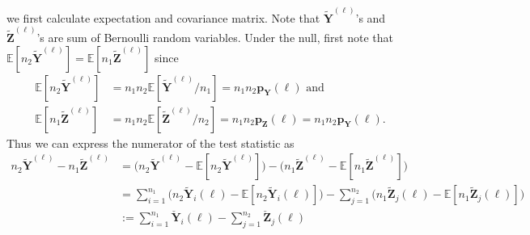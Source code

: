 \documentclass[11pt]{article} %
\newcommand{\vecBold}[1]{\boldsymbol{#1}} %
\newcommand{\distparamMultinom}{\boldsymbol{p}}
\newcommand{\mE}{\mathbb{E}} %
\newcommand{\rvY}{Y}
\newcommand{\rVecY}{\vecBold{\rvY}}
\newcommand{\rvZ}{Z}
\newcommand{\rVecZ}{\vecBold{\rvZ}}
\begin{document}
we first calculate expectation and covariance matrix.
Note that $\tilde{\rVecY}^{(\ell)}$'s and $\tilde{\rVecZ}^{(\ell)}$'s are sum of Bernoulli random variables.
Under the null, first note that
$
	\mE[n_2 \tilde{\rVecY}^{(\ell)}] = 
	\mE[n_1 \tilde{\rVecZ}^{(\ell)}]
$
since
\begin{align*}
	\mE[n_2 \tilde{\rVecY}^{(\ell)}] &= n_1n_2\mE[\tilde{\rVecY}^{(\ell)}/n_1] = n_1 n_2
	\distparamMultinom_{\rVecY}(\ell) \text{ and}
	\\
	\mE[n_1 \tilde{\rVecZ}^{(\ell)}] &= n_1n_2\mE[\tilde{\rVecZ}^{(\ell)}/n_2] = n_1 n_2 \distparamMultinom_{\rVecZ}(\ell) = n_1 n_2 \distparamMultinom_{\rVecY}(\ell).
\end{align*}
Thus we can express the numerator of the test statistic as 
\begin{align*}
n_2 \tilde{\rVecY}^{(\ell)} - n_1 \tilde{\rVecZ}^{(\ell)}
&=
\bigl(
n_2 \tilde{\rVecY}^{(\ell)} - \mE[n_2 \tilde{\rVecY}^{(\ell)}]
\bigr)
-
\bigl(
n_1 \tilde{\rVecZ}^{(\ell)} - \mE[n_1 \tilde{\rVecZ}^{(\ell)}]
\bigr)
\\
&=
\sum_{i=1}^{n_1}
\bigl(
n_2 \tilde{\rVecY}_i(\ell)
-
\mE[n_2 \tilde{\rVecY}_i(\ell)]
\bigr)
-
\sum_{j=1}^{n_2}
\bigl(
n_1 \tilde{\rVecZ}_j(\ell)
-
\mE[n_1 \tilde{\rVecZ}_j(\ell)]
\bigr)
\\
&:=
\sum_{i=1}^{n_1}
\check{\rVecY}_i(\ell)
-
\sum_{j=1}^{n_2}
\check{\rVecZ}_j(\ell)
\end{align*}
\end{document}
